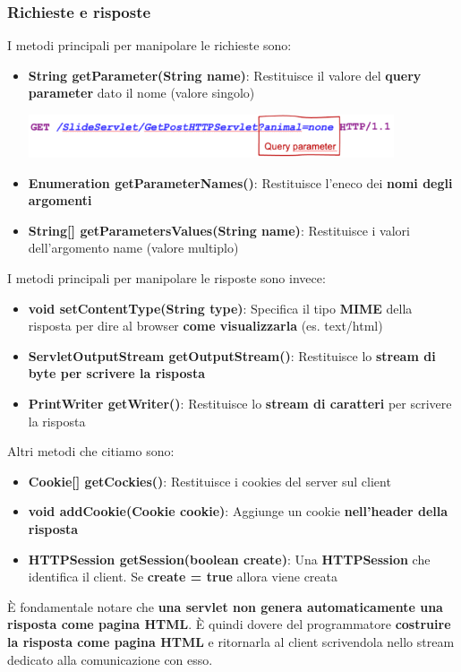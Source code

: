 \documentclass[12pt]{article}
\begin{document}
\subsubsection{Richieste e risposte}
I metodi principali per manipolare le richieste sono:
\begin{itemize}
    \item \textbf{String getParameter(String name)}: Restituisce il valore del \textbf{query parameter} dato il nome (valore singolo)
    \begin{center}
        \includegraphics[width = 0.85\textwidth]{Images/185.png}
    \end{center}
    \item \textbf{Enumeration getParameterNames()}: Restituisce l'eneco dei \textbf{nomi degli argomenti}
    \item \textbf{String[] getParametersValues(String name)}: Restituisce i valori dell'argomento name (valore multiplo)
\end{itemize}
I metodi principali per manipolare le risposte sono invece:
\begin{itemize}
    \item \textbf{void setContentType(String type)}: Specifica il tipo \textbf{MIME} della risposta per dire al browser \textbf{come visualizzarla} (es. text/html)
    \item \textbf{ServletOutputStream getOutputStream()}: Restituisce lo \textbf{stream di byte per scrivere la risposta}
    \item \textbf{PrintWriter getWriter()}: Restituisce lo \textbf{stream di caratteri} per scrivere la risposta
\end{itemize}
Altri metodi che citiamo sono:
\begin{itemize}
    \item \textbf{Cookie[] getCockies()}: Restituisce i cookies del server sul client
    \item \textbf{void addCookie(Cookie cookie)}: Aggiunge un cookie \textbf{nell'header della risposta}
    \item \textbf{HTTPSession getSession(boolean create)}: Una \textbf{HTTPSession} che identifica il client. Se \textbf{create = true} allora viene creata
\end{itemize}
È fondamentale notare che \textbf{una servlet non genera automaticamente una risposta come pagina HTML}. È quindi dovere del programmatore \textbf{costruire la risposta come pagina HTML} e ritornarla al client
scrivendola nello stream dedicato alla comunicazione con esso.
\end{document}

